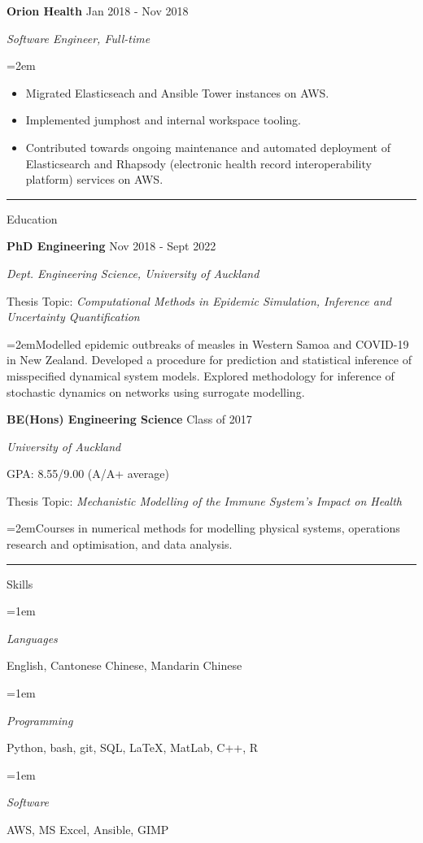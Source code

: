 \documentclass[paper=a4paper,fontsize=11pt]{scrartcl}
\newcommand{\pagerule}[1][2pt]{\noindent\rule{\textwidth}{#1}}
\newcommand{\usingfont}[2]{#1 #2 \par \normalsize \normalfont}
\newcommand{\sectionheader}[1]{\pagerule \vspace{0.05ex} \usingfont{\usefont{T1}{phv}{m}{v} \Large}{\noindent \hspace{-0.5em} #1} \vspace{0.5ex}}
\newlength{\spacebox}
\newcommand{\indented}[1][2em]{\noindent\hangindent=#1\hangafter=0}
\begin{document}
\normalsize \par\par
\noindent \textbf{Orion Health} \hfill
{Jan 2018 - Nov 2018} \par
\noindent \textit{Software Engineer, Full-time} \par
\indented \small {
    \begin{itemize}
    \setlength{\itemsep}{0ex}
        \item Migrated Elasticseach and Ansible Tower instances on AWS.
        \item Implemented jumphost and internal workspace tooling.
        \item Contributed towards ongoing maintenance and automated
deployment of Elasticsearch and Rhapsody (electronic health record
interoperability platform) services on AWS.
        \end{itemize}
}
\normalsize \par\par

\sectionheader{Education}
\noindent \textbf{PhD Engineering} \hfill
Nov 2018 - Sept 2022 \par
\noindent \textit{Dept. Engineering Science, University of
Auckland} \par
\small Thesis Topic: \emph{Computational Methods in Epidemic Simulation,
Inference and Uncertainty Quantification} \par
\indented \small Modelled epidemic outbreaks of measles in Western Samoa
and COVID-19 in New Zealand. Developed a procedure for prediction and
statistical inference of misspecified dynamical system models. Explored
methodology for inference of stochastic dynamics on networks using
surrogate modelling.
\normalsize \par\par
\noindent \textbf{BE(Hons) Engineering Science} \hfill
Class of 2017 \par
\noindent \textit{University of Auckland} \par
\small GPA: 8.55/9.00 (A/A+ average) \par
\small Thesis Topic: \emph{Mechanistic Modelling of the Immune System's
Impact on Health} \par
\indented \small Courses in numerical methods for modelling physical
systems, operations research and optimisation, and data analysis.
\normalsize \par\par

\sectionheader{Skills}
\indented[1em] \parbox{\spacebox}{\textit{Languages}} 
\hspace{1.5em} English, Cantonese Chinese, Mandarin Chinese
\par
\indented[1em] \parbox{\spacebox}{\textit{Programming}} 
\hspace{1.5em} Python, bash, git, SQL, \LaTeX, MatLab, C++, R
\par
\indented[1em] \parbox{\spacebox}{\textit{Software}} 
\hspace{1.5em} AWS, MS Excel, Ansible, GIMP
\par
\end{document}
